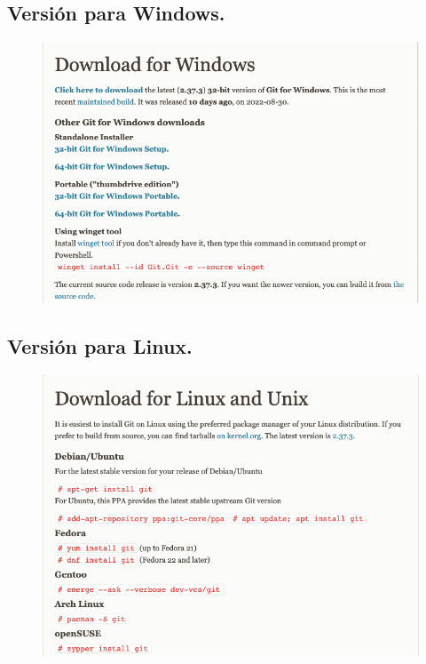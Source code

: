 \subsection*{Versión para Windows.}

\begin{figure}[H]
    \centering
    \includegraphics[scale=0.4]{Imagenes/git_03.png}
\end{figure}

\subsection*{Versión para Linux.}

\begin{figure}[H]
    \centering
    \includegraphics[scale=0.4]{Imagenes/git_04.png}
\end{figure}


